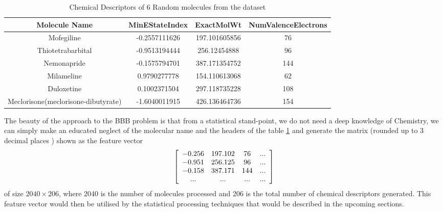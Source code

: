 \documentclass[a4paper,12pt]{report}
\begin{document}
					\begin{table}[ht!]
						\caption{Chemical Descriptors of 6 Random molecules from the dataset}
						\centering
						\begin{tabular}{ | c | c | c | c |   }
							\hline
							Molecule Name & MinEStateIndex & ExactMolWt & NumValenceElectrons \\
							\hline
							Mofegiline & -0.2557111626 & 197.101605856 & 76 \\
							\hline
							Thiotetrabarbital & -0.9513194444 & 256.12454888 & 96 \\
							\hline
							Nemonapride & -0.1575794701 & 387.171354752 & 144 \\
							\hline
							Milameline & 0.9790277778 & 154.110613068 & 62 \\
							\hline
							Duloxetine & 0.1002371504 & 297.118735228 & 108 \\
							\hline
							Meclorisone(meclorisone-dibutyrate) & -1.6040011915 & 426.136464736 & 154 \\
							\hline
						\end{tabular}
						\label{table:random_chem_descriptors}
					\end{table}
				The beauty of the approach to the BBB problem is that from a statistical stand-point, we do not need a deep knowledge of Chemistry, we can simply make an educated neglect of the molecular name and the headers of the table \ref{table:random_chem_descriptors} and generate the matrix (rounded up to 3 decimal places ) shown as the feature vector
				\[ \left[ \begin{array}{c c c c}
					-0.256 & 197.102 & 76 & ... \\
					-0.951 & 256.125 & 96 & ... \\
					-0.158 & 387.171 & 144 & ... \\
					... & ... & ... & ...
				\end{array}
				\right]\]
				of size $2040 \times 206$, where 2040 is the number of molecules processed and 206 is the total number of chemical descriptors generated. This feature vector would then be utilised by the statistical processing techniques that would be described in the upcoming sections.
\end{document}
